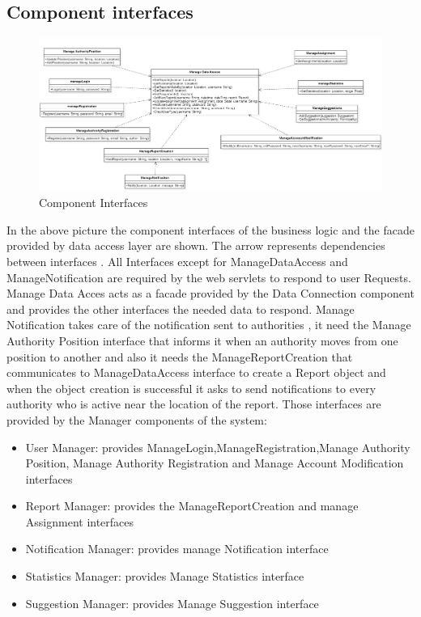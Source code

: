 \subsection{Component interfaces}
\begin{figure}[H]
\centering
\includegraphics[width=\textwidth]{Images/Interfaces.png}
\caption{\label{fig:ComWI}Component Interfaces}
\end{figure}
In the above picture the component interfaces of the business logic and the facade provided by data access layer are shown.
The arrow represents dependencies between interfaces .
All Interfaces except for ManageDataAccess and ManageNotification are required by the web servlets to respond to user Requests.
Manage Data Acces acts as a facade provided by the Data Connection component and provides the other interfaces the needed data to respond.
Manage Notification takes care of the notification sent to authorities , it need the  Manage Authority Position interface that informs it when an authority moves from one position to another and also it needs the ManageReportCreation  that communicates to ManageDataAccess interface to create a Report object and when the object creation is successful it asks to send notifications to every authority who is active near the location of the report.
Those interfaces are provided by the Manager components of the system:
\begin{itemize}
\item User Manager: provides ManageLogin,ManageRegistration,Manage Authority Position, Manage Authority Registration and Manage Account Modification interfaces
\item Report Manager: provides the ManageReportCreation and manage Assignment interfaces
\item Notification Manager: provides manage Notification interface
\item Statistics Manager:  provides Manage Statistics interface
\item Suggestion Manager: provides Manage Suggestion interface
\end{itemize}
